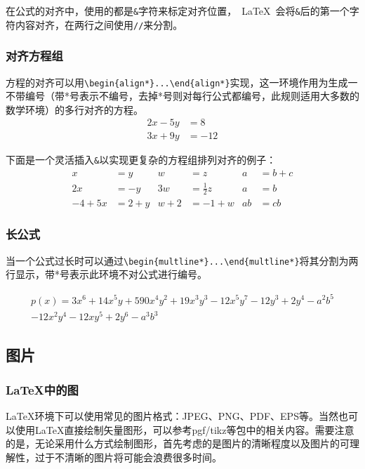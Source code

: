 在公式的对齐中，使用的都是\verb|&|字符来标定对齐位置，~\LaTeX~会将\verb|&|后的第一个字符内容对齐，在两行之间使用\verb|//|来分割。

\subsubsection{对齐方程组}

方程的对齐可以用\verb|\begin{align*}...\end{align*}|实现，这一环境作用为生成一不带编号（带*号表示不编号，去掉*号则对每行公式都编号，此规则适用大多数的数学环境）的多行对齐的方程。
\begin{align*} 
2x - 5y &=  8 \\ 
3x + 9y &=  -12
\end{align*}

下面是一个灵活插入\verb|&|以实现更复杂的方程组排列对齐的例子：
\begin{align*}
x&=y           &  w &=z              &  a&=b+c\\
2x&=-y         &  3w&=\frac{1}{2}z   &  a&=b\\
-4 + 5x&=2+y   &  w+2&=-1+w          &  ab&=cb
\end{align*}

\subsubsection{长公式}

当一个公式过长时可以通过\verb|\begin{multline*}...\end{multline*}|将其分割为两行显示，带*号表示此环境不对公式进行编号。

\begin{multline*}
p(x) = 3x^6 + 14x^5y + 590x^4y^2 + 19x^3y^3- 12x^5y^7 - 12y^3 + 2y^4 - a^2b^5\\ 
- 12x^2y^4 - 12xy^5 + 2y^6 - a^3b^3
\end{multline*}

\subsection{图片}

\subsubsection{\LaTeX 中的图}

\LaTeX 环境下可以使用常见的图片格式：JPEG、PNG、PDF、EPS等。当然也可以使用\LaTeX 直接绘制矢量图形，可以参考pgf/tikz等包中的相关内容。需要注意的是，无论采用什么方式绘制图形，首先考虑的是图片的清晰程度以及图片的可理解性，过于不清晰的图片将可能会浪费很多时间。

